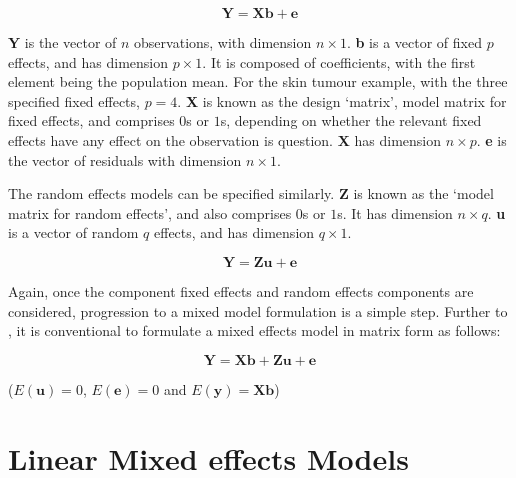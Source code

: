\documentclass[12pt, a4paper]{report}
\theoremstyle{plain}
\theoremstyle{definition}
\theoremstyle{remark}
\begin{document}
\begin{equation}
\textbf{Y} = \textbf{Xb} + \textbf{e}
\end{equation}

\textbf{Y} is the vector of $n$ observations, with dimension $n
\times 1$. \textbf{b} is a vector of fixed $p$ effects, and has
dimension $p \times 1$. It is composed of coefficients, with the
first element being the population mean. For the skin tumour
example, with the three specified fixed effects, $p=4$. \textbf{X}
is known as the design `matrix', model matrix for fixed effects,
and comprises $0$s or $1$s, depending on whether the relevant
fixed effects have any effect on the observation is question.
\textbf{X} has dimension $n \times p$. \textbf{e} is the vector of
residuals with dimension $n \times 1$.

The random effects models can be specified similarly. \textbf{Z}
is known as the `model matrix for random effects', and also
comprises $0$s or $1$s. It has dimension $n \times q$. \textbf{u}
is a vector of random $q$ effects, and has dimension $q \times 1$.

\begin{equation}
\textbf{Y} = \textbf{Zu} + \textbf{e}
\end{equation}

Again, once the component fixed effects and random effects
components are considered, progression to a mixed model
formulation is a simple step. Further to \citet{lw82}, it is
conventional to formulate a mixed effects model in matrix form as
follows:

\begin{equation}
\textbf{Y} = \textbf{Xb} + \textbf{Zu} + \textbf{e}
\end{equation}

($E(\textbf{u})=0$, $E(\textbf{e})=0 $ and $E(\textbf{y}) =
\textbf{Xb}$)

\section{Linear Mixed effects Models}







\end{document}
